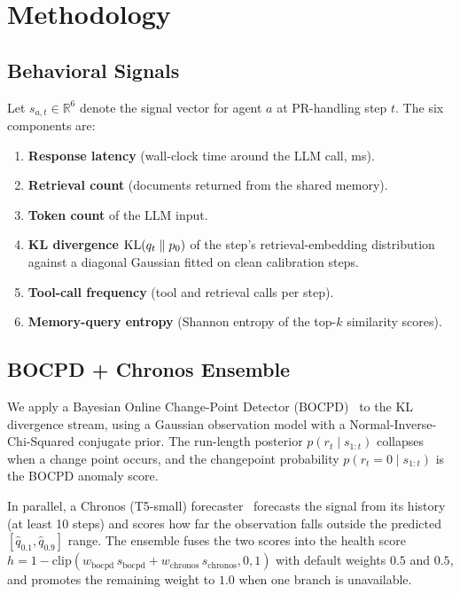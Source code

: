 \section{Methodology}
\label{sec:methodology}

\subsection{Behavioral Signals}
\label{sec:methodology:signals}

Let $s_{a,t} \in \mathbb{R}^6$ denote the signal vector for agent $a$
at PR-handling step $t$. The six components are:
\begin{enumerate}
  \item \textbf{Response latency} (wall-clock time around the LLM
  call, ms).
  \item \textbf{Retrieval count} (documents returned from the shared
  memory).
  \item \textbf{Token count} of the LLM input.
  \item \textbf{KL divergence} $\text{KL}(q_t \parallel p_0)$ of the
  step's retrieval-embedding distribution against a diagonal Gaussian
  fitted on clean calibration steps.
  \item \textbf{Tool-call frequency} (tool and retrieval calls per
  step).
  \item \textbf{Memory-query entropy} (Shannon entropy of the top-$k$
  similarity scores).
\end{enumerate}

\subsection{BOCPD + Chronos Ensemble}
\label{sec:methodology:detector}

We apply a Bayesian Online Change-Point Detector
(BOCPD)~\citep{adams2007bocpd} to the KL divergence stream, using a
Gaussian observation model with a Normal-Inverse-Chi-Squared conjugate
prior. The run-length posterior $p(r_t \mid s_{1:t})$ collapses when a
change point occurs, and the changepoint probability
$p(r_t = 0 \mid s_{1:t})$ is the BOCPD anomaly score.

In parallel, a Chronos (T5-small) forecaster~\citep{chronos} forecasts
the signal from its history (at least 10 steps) and scores how far the
observation falls outside the predicted
$[\hat{q}_{0.1}, \hat{q}_{0.9}]$ range. The ensemble fuses the two
scores into the health score
$h = 1 - \mathrm{clip}(w_{\text{bocpd}}\, s_{\text{bocpd}} + w_{\text{chronos}}\, s_{\text{chronos}}, 0, 1)$
with default weights $0.5$ and $0.5$, and promotes the remaining
weight to $1.0$ when one branch is unavailable.

